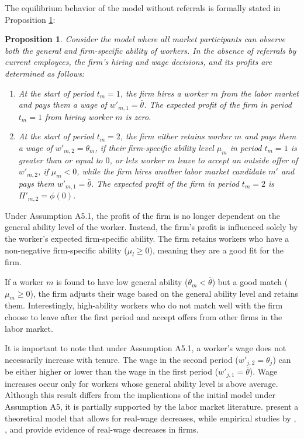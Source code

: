\documentclass[12pt]{article}
\newtheorem{proposition}{Proposition}
\begin{document}
The equilibrium behavior of the model without referrals is formally stated in Proposition \ref{prop:ext_eq_nr}:
\begin{proposition}\label{prop:ext_eq_nr}
     Consider the model where all market participants can observe both the general and firm-specific ability of workers. In the absence of referrals by current employees, the firm's hiring and wage decisions, and its profits are determined as follows:
    \begin{enumerate}[label={\roman*})]
        \item At the start of period $t_m = 1$, the firm hires a worker $m$ from the labor market and pays them a wage of $w'_{m,1} = \bar{\theta}$. The expected profit of the firm in period $t_m = 1$ from hiring worker $m$ is zero.
        \item At the start of period $t_m = 2$, the firm either retains worker $m$ and pays them a wage of $w'_{m,2} = \theta_m$, if their firm-specific ability level $\mu_m$ in period $t_m = 1$ is greater than or equal to $0$, or lets worker $m$ leave to accept an outside offer of $w'_{m,2}$, if $\mu_m < 0$, while the firm hires another labor market candidate $m'$ and pays them $w'_{m,1} = \bar{\theta}$. The expected profit of the firm in period $t_m = 2$ is $\Pi'_{m,2} = \phi(0)$.
	\end{enumerate}
\end{proposition}

Under Assumption A5.1, the profit of the firm is no longer dependent on the general ability level of the worker. Instead, the firm's profit is influenced solely by the worker's expected firm-specific ability. The firm retains workers who have a non-negative firm-specific ability ($\mu_l \geq 0$), meaning they are a good fit for the firm.

If a worker $m$ is found to have low general ability ($\theta_m < \bar{\theta}$) but a good match ($\mu_m \geq 0$), the firm adjusts their wage based on the general ability level and retains them. Interestingly, high-ability workers who do not match well with the firm choose to leave after the first period and accept offers from other firms in the labor market.

It is important to note that under Assumption A5.1, a worker's wage does not necessarily increase with tenure. The wage in the second period ($w'_{j,2} = \theta_j$) can be either higher or lower than the wage in the first period ($w'_{j,1} = \bar{\theta}$). Wage increases occur only for workers whose general ability level is above average. Although this result differs from the implications of the initial model under Assumption A5, it is partially supported by the labor market literature. \cite{gibbons1999theory} present a theoretical model that allows for real-wage decreases, while empirical studies by \cite{mclaughlin1994rigid}, \cite{baker1994internal, baker1994wage}, and \cite{card1997does} provide evidence of real-wage decreases in firms.
\end{document}
